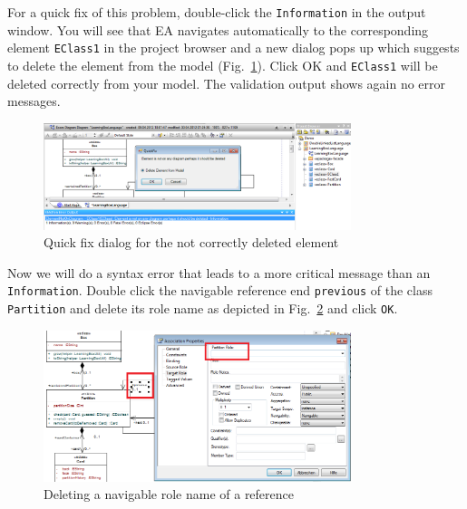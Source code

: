 For a quick fix of this problem, double-click the \texttt{Information} in the output window. 
You will see that EA navigates automatically to the corresponding element \texttt{EClass1} in the project browser and a new dialog pops up which suggests to delete the element from the model (Fig.~\ref{fig:quick-fix1}).
Click OK and \texttt{EClass1} will be deleted correctly from your model. 
The validation output shows again no error messages.

\begin{figure}[htbp]
	\centering 
  \includegraphics[width=0.8\textwidth]{pics/memBoxBilder/memBox45} 
	\caption{Quick fix dialog for the not correctly deleted element}
	\label{fig:quick-fix1}
\end{figure}

Now we will do a syntax error that leads to a more critical message than an \texttt{Information}. 
Double click the navigable reference end \texttt{previous} of the class \texttt{Partition} and delete its role name as depicted in Fig.~\ref{fig:delete-role-name} and click \texttt{OK}.

\begin{figure}[htbp]
	\centering
  \includegraphics[width=0.8\textwidth]{pics/memBoxBilder/memBox46} 
	\caption{Deleting a navigable role name of a reference}
	\label{fig:delete-role-name}
\end{figure}

